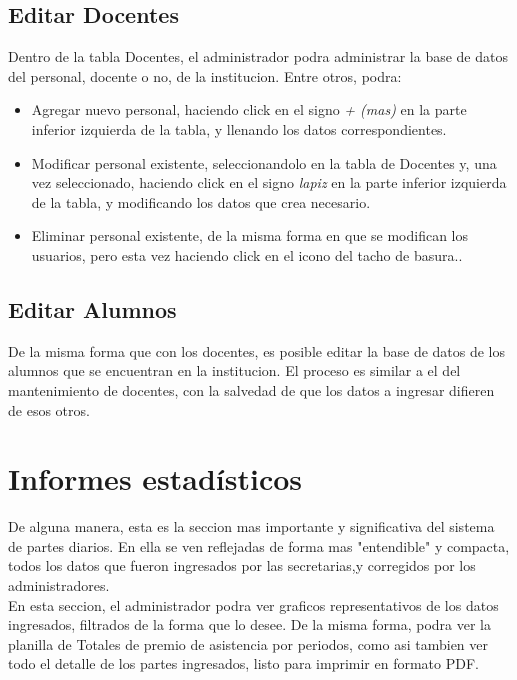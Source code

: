 \documentclass[12pt,a4paper]{article}
\begin{document}
\subsection{Editar Docentes}
Dentro de la tabla Docentes, el administrador podra administrar la base de datos del personal, docente o no, de la institucion. Entre otros, podra:
\begin{itemize}
\item Agregar nuevo personal, haciendo click en el signo \textit{+ (mas)} en la parte inferior izquierda de la tabla, y llenando los datos correspondientes.
\item Modificar personal existente, seleccionandolo en la tabla de Docentes y, una vez seleccionado, haciendo click en el signo \textit{lapiz} en la parte inferior izquierda de la tabla, y modificando los datos que crea necesario.
\item Eliminar personal existente, de la misma forma en que se modifican los usuarios, pero esta vez haciendo click en el icono del tacho de basura..
\end{itemize}

\subsection{Editar Alumnos}
De la misma forma que con los docentes, es posible editar la base de datos de los alumnos que se encuentran en la institucion. El proceso es similar a el del mantenimiento de docentes, con la salvedad de que los datos a ingresar difieren de esos otros.

\section{Informes estadísticos}
De alguna manera, esta es la seccion mas importante y significativa del sistema de partes diarios. En ella se ven reflejadas de forma mas "entendible" y compacta, todos los datos que fueron ingresados por las secretarias,y corregidos por los administradores. \\
En esta seccion, el administrador podra ver graficos representativos de los datos ingresados, filtrados de la forma que lo desee. De la misma forma, podra ver la planilla de Totales de premio de asistencia por periodos, como asi tambien ver todo el detalle de los partes ingresados, listo para imprimir en formato PDF.
\end{document}
